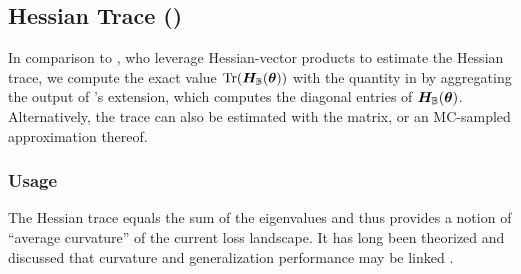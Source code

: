 \subsection{Hessian Trace
  ()}\label{cockpit::app:hessian-trace}

In comparison to \citet{yao2020pyhessian}, who leverage Hessian-vector products
\citep{pearlmutter1994fast} to estimate the Hessian trace, we compute the exact
value $\operatorname{Tr}({\bm{H}}_{{\mathbb{B}}}({\bm{\theta}}))$ with the  quantity in
\cockpit by aggregating the output of \backpack's
\href{https://docs.backpack.pt/en/master/extensions.html#backpack.extensions.DiagHessian}{}
extension, which computes the diagonal entries of ${\bm{H}}_{{\mathbb{B}}}({\bm{\theta}})$.
Alternatively, the trace can also be estimated with the \ggn matrix, or an
MC-sampled approximation thereof.

\subsubsection{Usage}

The Hessian trace equals the sum of the eigenvalues and thus provides a notion
of ``average curvature'' of the current loss landscape. It has long been
theorized and discussed that curvature and generalization performance may be
linked \cite[\eg]{hochreiter1997flat}.

